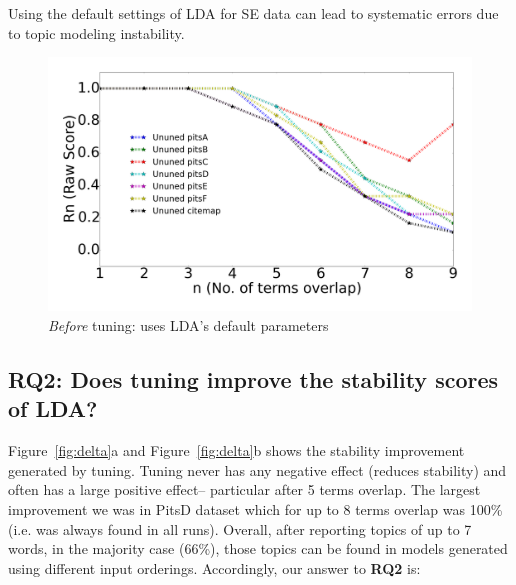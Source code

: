 \documentclass[10pt,conference]{IEEEtran}
\theoremstyle{break}
\begin{document}
 
\begin{lesson}
  Using the default settings of LDA for SE data can lead to systematic errors due to topic
  modeling instability. 
\end{lesson}

\begin{figure}[!h]
  \begin{center}
    \includegraphics[width=\linewidth]{./fig/Vem_untuned.png}
    \end{center}
  \caption{{\em Before} tuning: uses LDA's default parameters}\label{fig:delta11}  
\end{figure}

\subsection{\textbf{RQ2: Does tuning improve the stability scores of LDA?}}

 Figure~\ref{fig:delta}a and Figure~\ref{fig:delta}b shows the stability improvement
 generated by tuning.
   Tuning never
  has any negative effect (reduces stability) and often has a large positive effect--
  particular  after 5 terms overlap.
   The largest improvement  we
   was  in PitsD dataset which for up to 8 terms overlap was 100\% (i.e. was always
   found in all runs).
   Overall, after reporting topics of up to 7 words, in the majority case (66\%),
  those topics can be found in models generated using different input orderings.
  Accordingly, our answer to {\bf RQ2} is:
\end{document}
